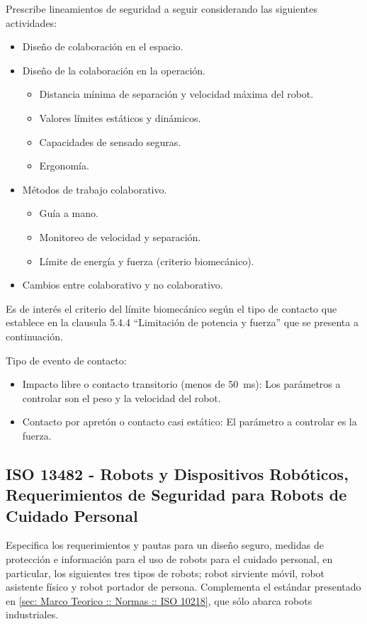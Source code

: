 \documentclass[withindex,glossary]{cam-thesis}
\begin{document}
Prescribe lineamientos de seguridad a seguir considerando las siguientes actividades:
\begin{itemize}[topsep=-11pt]
	\item Diseño de colaboración en el espacio.
    \item Diseño de la colaboración en la operación.
    	\begin{itemize}
    		\item Distancia mínima de separación y velocidad máxima del robot.
            \item Valores límites estáticos y dinámicos.
            \item Capacidades de sensado seguras.
            \item Ergonomía.
    	\end{itemize}
	\item Métodos de trabajo colaborativo.
    	\begin{itemize}
    		\item Guía a mano.
            \item Monitoreo de velocidad y separación.
            \item Límite de energía y  fuerza (criterio biomecánico).
    	\end{itemize}
	\item Cambios entre colaborativo y no colaborativo.
\\[-7pt]
\end{itemize}

Es de interés el criterio del límite biomecánico según el tipo de contacto que establece en la clausula 5.4.4 ``Limitación de potencia y fuerza'' que se presenta a continuación.

Tipo de evento de contacto:
\begin{itemize}[topsep=-11pt]
	\item Impacto libre o contacto transitorio (menos de \SI{50}{\milli\second}): Los parámetros a controlar son el peso y la velocidad del robot.
    \item Contacto por apretón o contacto casi estático: El parámetro a controlar es la fuerza.
\end{itemize}

\subsection{ISO 13482 - Robots y Dispositivos Robóticos, Requerimientos de Seguridad para Robots de Cuidado Personal}
Especifica los requerimientos y pautas para un diseño seguro, medidas de protección e información para el uso de robots para el cuidado personal, en particular, los siguientes tres tipos de robots; robot sirviente móvil, robot asistente físico y robot portador de persona. Complementa el estándar presentado en \ref{sec: Marco Teorico :: Normas :: ISO 10218}, que sólo abarca robots industriales.
\end{document}
